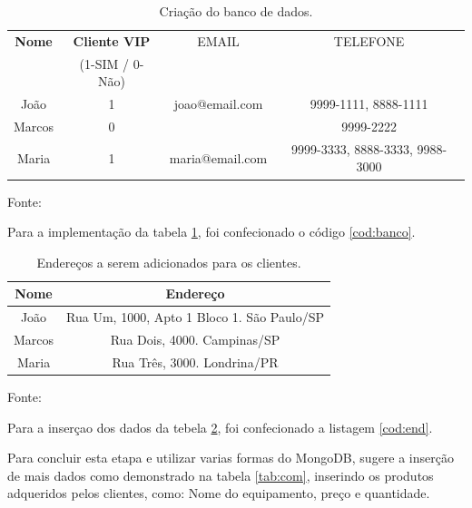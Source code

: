 \begin{table}[H]
\center
  \caption{Criação do banco de dados.}
  \begin{tabular}{ | c | c  | c | c |}
      \hline
      \textbf{Nome} & \textbf{Cliente VIP} & EMAIL & TELEFONE \\
          & (1-SIM / 0-Não)  &  &    \\
      \hline
          João & 1 & joao@email.com & 9999-1111, 8888-1111 \\
      \hline
          Marcos & 0 &  & 9999-2222 \\
      \hline
          Maria & 1 &maria@email.com & 9999-3333, 8888-3333, 9988-3000 \\
      \hline
  \end{tabular}
  \label{tab:banco}
  \flushleft %

  {\fontsize{10pt}{\baselineskip}\selectfont
    Fonte: }
\end{table}

\par Para a implementação da tabela \ref{tab:banco}, foi confecionado o código \ref{cod:banco}.


\begin{table}[H]
  \caption{Endereços a serem adicionados para os clientes.}
  \center
  \begin{tabular}{ | c | c |}
      \hline
      \textbf{Nome} & \textbf{Endereço} \\
      \hline
          João & Rua Um, 1000, Apto 1 Bloco 1. São Paulo/SP \\
      \hline
          Marcos & Rua Dois, 4000. Campinas/SP \\
      \hline
          Maria & Rua Três, 3000. Londrina/PR \\
      \hline
  \end{tabular}
  \label{tab:end}
  \flushleft %

  {\fontsize{10pt}{\baselineskip}\selectfont
    Fonte: }
\end{table}

\par Para a inserçao dos dados da tebela \ref{tab:end}, foi confecionado a listagem \ref{cod:end}.

\par Para concluir esta etapa e utilizar varias formas do MongoDB, sugere a inserção de mais dados como demonstrado na tabela \ref{tab:com}, inserindo os produtos adqueridos pelos clientes, como: Nome do equipamento, preço e quantidade.

